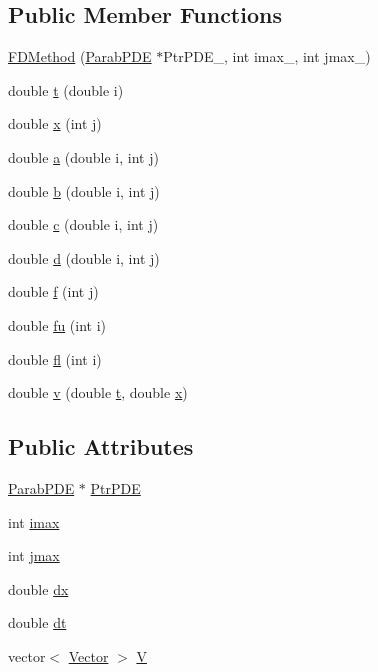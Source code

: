 \subsection*{Public Member Functions}
\begin{DoxyCompactItemize}
\item 
\hyperlink{classFDMethod_a87a98e06038c3bc9e88e639ded56d1cb}{F\+D\+Method} (\hyperlink{classParabPDE}{Parab\+P\+D\+E} $\ast$Ptr\+P\+D\+E\+\_\+, int imax\+\_\+, int jmax\+\_\+)
\item 
double \hyperlink{classFDMethod_a9aaf3e419045497b888808537fef2b19}{t} (double i)
\item 
double \hyperlink{classFDMethod_a8e5c9b6b56eb6c9d00267a4028814314}{x} (int j)
\item 
double \hyperlink{classFDMethod_a2b5d6d1d62048312725c60c5a99ee0d1}{a} (double i, int j)
\item 
double \hyperlink{classFDMethod_a50c258eaca61c1ed34247ad827379668}{b} (double i, int j)
\item 
double \hyperlink{classFDMethod_ad5c8725fb0379fa8cb29bb0954d60112}{c} (double i, int j)
\item 
double \hyperlink{classFDMethod_a4ad2213e6338bdfc2cc8a2b4e7eb0952}{d} (double i, int j)
\item 
double \hyperlink{classFDMethod_a02f9d3f5c3466f04323bb966b346efae}{f} (int j)
\item 
double \hyperlink{classFDMethod_ae282bd4b389fdce1badb5ecaa3c3e8e5}{fu} (int i)
\item 
double \hyperlink{classFDMethod_add9102baa92871331350bf5d86c12f1a}{fl} (int i)
\item 
double \hyperlink{classFDMethod_a703b25f3d7f5083bfd9fbbe9e1906946}{v} (double \hyperlink{classFDMethod_a9aaf3e419045497b888808537fef2b19}{t}, double \hyperlink{classFDMethod_a8e5c9b6b56eb6c9d00267a4028814314}{x})
\end{DoxyCompactItemize}
\subsection*{Public Attributes}
\begin{DoxyCompactItemize}
\item 
\hyperlink{classParabPDE}{Parab\+P\+D\+E} $\ast$ \hyperlink{classFDMethod_a900e2425569c70cf67c0b89fbeb15aba}{Ptr\+P\+D\+E}
\item 
int \hyperlink{classFDMethod_a72f22ed3e70c7f6084d3499fa7fbad38}{imax}
\item 
int \hyperlink{classFDMethod_a6d4cec47464758c00c5d65cfa676d518}{jmax}
\item 
double \hyperlink{classFDMethod_aec2698863360e900a8d84f7d672484c9}{dx}
\item 
double \hyperlink{classFDMethod_a4748bd052a59842154022b9aa6b55737}{dt}
\item 
vector$<$ \hyperlink{FDMethod_8h_a9a0795b74fd145527f628932c8884ffe}{Vector} $>$ \hyperlink{classFDMethod_a627ca1e8a18af23dbbe44a43cbc2831e}{V}
\end{DoxyCompactItemize}


